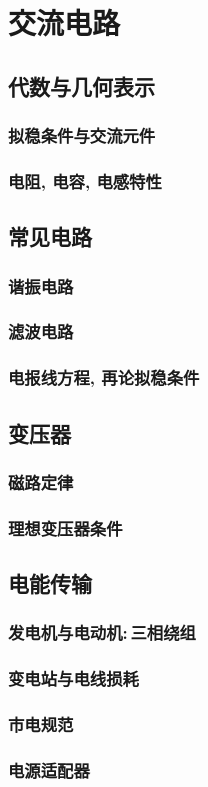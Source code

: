 \chapter{交流电路}


\section{代数与几何表示}

\subsection{拟稳条件与交流元件}

\subsection{电阻, 电容, 电感特性}

\section{常见电路}

\subsection{谐振电路}

\subsection{滤波电路}

\subsection{电报线方程, 再论拟稳条件}

\section{变压器}

\subsection{磁路定律}

\subsection{理想变压器条件}

\section{电能传输}

\subsection{发电机与电动机:\,三相绕组}

\subsection{变电站与电线损耗}

\subsection{市电规范}

\subsection{电源适配器}
